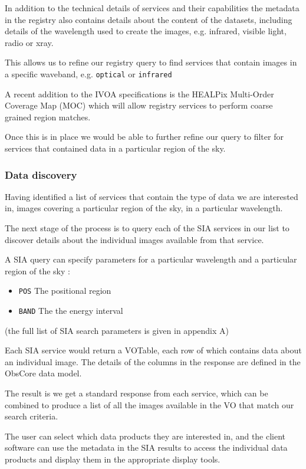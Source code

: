 \documentclass{article}
\begin{document}
In addition to the technical details of services and their capabilities
the metadata in the registry also contains details about the content of the datasets,
including details of the wavelength used to create the images,
e.g. infrared, visible light, radio or xray.

This allows us to refine our registry query to find services that contain
images in a specific waveband,
e.g. \texttt{optical} or \texttt{infrared}

A recent addition to the IVOA specifications is the 
HEALPix Multi-Order Coverage Map (MOC)
which will allow registry services to perform coarse grained region matches.

Once this is in place we would be able to further refine our query to
filter for services that contained data in a particular region of the sky.

\subsubsection{Data discovery}

Having identified a list of services that contain the type of data we are
interested in, images covering a particular region of the sky,
in a particular wavelength.

The next stage of the process is to query each of the SIA services in our list
to discover details about the individual images available from that service.

\noindent
A SIA query can specify parameters for a particular wavelength and a particular
region of the sky :
\begin{itemize}
  \item \texttt{POS}  The positional region
  \item \texttt{BAND} The the energy interval
\end{itemize}
(the full list of SIA search parameters is given in appendix A)

Each SIA service would return a VOTable, each row of which contains data about an
individual image. The details of the columns in the response are defined
in the ObsCore  data model.

The result is we get a standard response from each service, which can be
combined to produce a list of all the images available in the VO that match
our search criteria.

The user can select which data products they are interested in, and the client
software can use the metadata in the SIA results to access the individual data
products and display them in the appropriate display tools.
\end{document}
